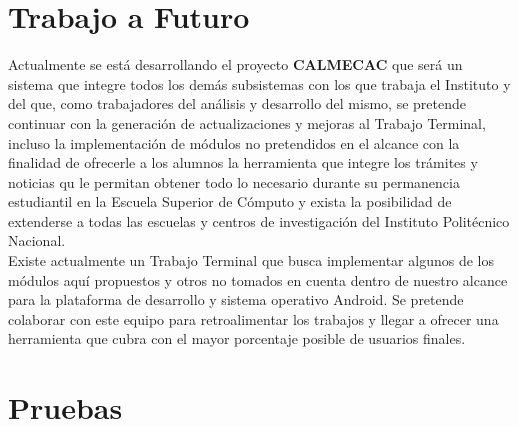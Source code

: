 %
%
%
%


\section{Trabajo a Futuro}

Actualmente se está desarrollando el proyecto \textbf{CALMECAC} que será un sistema que integre todos los demás subsistemas con los que trabaja el Instituto y del que, como trabajadores del análisis y desarrollo del mismo, se pretende continuar con la generación de actualizaciones y mejoras al Trabajo Terminal, incluso la implementación de módulos no pretendidos en el alcance con la finalidad de ofrecerle a los alumnos la herramienta que integre los trámites y noticias qu le permitan obtener todo lo necesario durante su permanencia estudiantil en la Escuela Superior de Cómputo y exista la posibilidad de extenderse a todas las escuelas y centros de investigación del Instituto Politécnico Nacional. \\

Existe actualmente un Trabajo Terminal que busca implementar algunos de los módulos aquí propuestos y otros no tomados en cuenta dentro de nuestro alcance para la plataforma de desarrollo y sistema operativo Android. Se pretende colaborar con este equipo para retroalimentar los trabajos y llegar a ofrecer una herramienta que cubra con el mayor porcentaje posible de usuarios finales. \\

\section{Pruebas}


